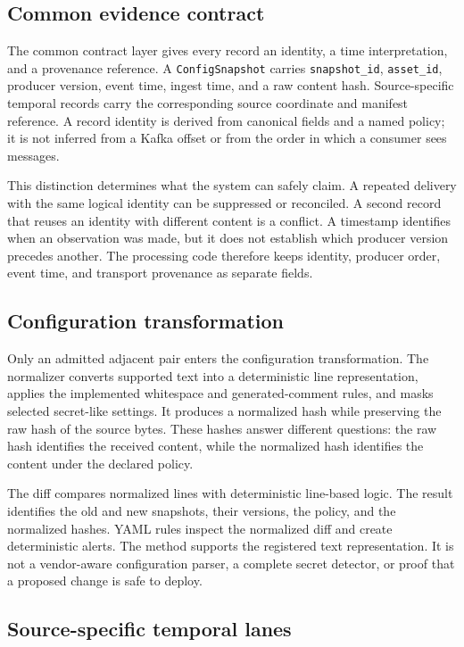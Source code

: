 \documentclass[a4paper,11pt]{article}
\begin{document}
\subsection{Common evidence contract}

The common contract layer gives every record an identity, a time interpretation, and a provenance reference. A \texttt{ConfigSnapshot} carries \texttt{snapshot\_id}, \texttt{asset\_id}, producer version, event time, ingest time, and a raw content hash. Source-specific temporal records carry the corresponding source coordinate and manifest reference. A record identity is derived from canonical fields and a named policy; it is not inferred from a Kafka offset or from the order in which a consumer sees messages.

This distinction determines what the system can safely claim. A repeated delivery with the same logical identity can be suppressed or reconciled. A second record that reuses an identity with different content is a conflict. A timestamp identifies when an observation was made, but it does not establish which producer version precedes another. The processing code therefore keeps identity, producer order, event time, and transport provenance as separate fields.

\subsection{Configuration transformation}

Only an admitted adjacent pair enters the configuration transformation. The normalizer converts supported text into a deterministic line representation, applies the implemented whitespace and generated-comment rules, and masks selected secret-like settings. It produces a normalized hash while preserving the raw hash of the source bytes. These hashes answer different questions: the raw hash identifies the received content, while the normalized hash identifies the content under the declared policy.

The diff compares normalized lines with deterministic line-based logic. The result identifies the old and new snapshots, their versions, the policy, and the normalized hashes. YAML rules inspect the normalized diff and create deterministic alerts. The method supports the registered text representation. It is not a vendor-aware configuration parser, a complete secret detector, or proof that a proposed change is safe to deploy.

\subsection{Source-specific temporal lanes}
\end{document}
